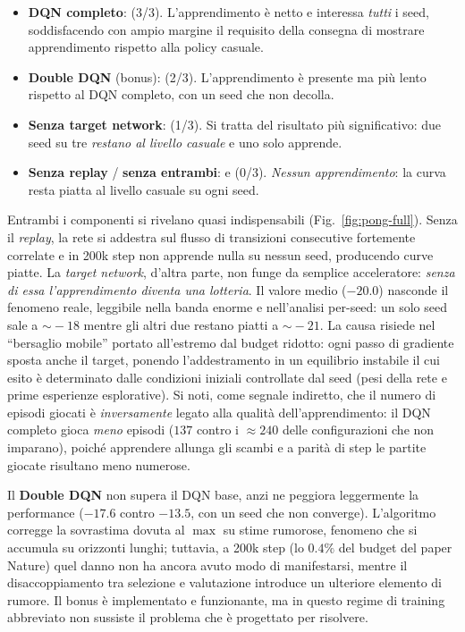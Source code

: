 \begin{itemize}
  \item \textbf{DQN completo}:  (3/3). L'apprendimento \`e netto e
        interessa \emph{tutti} i seed, soddisfacendo con ampio margine il requisito
        della consegna di mostrare apprendimento rispetto alla policy casuale.
  \item \textbf{Double DQN} (bonus):  (2/3). L'apprendimento \`e
        presente ma pi\`u lento rispetto al DQN completo, con un seed che non decolla.
  \item \textbf{Senza target network}:  (1/3). Si tratta del risultato
        pi\`u significativo: due seed su tre \emph{restano al livello casuale} e uno solo
        apprende.
  \item \textbf{Senza replay} / \textbf{senza entrambi}:  e
         (0/3). \emph{Nessun apprendimento}: la curva resta piatta al
        livello casuale su ogni seed.
\end{itemize}



Entrambi i componenti si rivelano quasi indispensabili (Fig.~\ref{fig:pong-full}).
Senza il \emph{replay}, la rete si addestra sul flusso di transizioni consecutive
fortemente correlate e in 200k step non apprende nulla su nessun seed, producendo curve
piatte. La \emph{target network}, d'altra parte, non funge da semplice acceleratore:
\emph{senza di essa l'apprendimento diventa una lotteria}. Il valore medio ($-20.0$)
nasconde il fenomeno reale, leggibile nella banda enorme e nell'analisi per-seed: un
solo seed sale a $\sim\!-18$ mentre gli altri due restano piatti a $\sim\!-21$. La causa
risiede nel ``bersaglio mobile'' portato all'estremo dal budget ridotto: ogni passo di
gradiente sposta anche il target, ponendo l'addestramento in un equilibrio instabile il
cui esito \`e determinato dalle condizioni iniziali controllate dal seed (pesi della rete
e prime esperienze esplorative). Si noti, come segnale indiretto, che il numero di
episodi giocati \`e \emph{inversamente} legato alla qualit\`a dell'apprendimento: il DQN
completo gioca \emph{meno} episodi ($137$ contro i $\approx 240$ delle configurazioni che
non imparano), poich\'e apprendere allunga gli scambi e a parit\`a di step le partite
giocate risultano meno numerose.

Il \textbf{Double DQN} non supera il DQN base, anzi ne peggiora leggermente la
performance ($-17.6$ contro $-13.5$, con un seed che non converge). L'algoritmo
corregge la sovrastima dovuta al $\max$ su stime rumorose, fenomeno che si accumula su
orizzonti lunghi; tuttavia, a 200k step (lo $0.4\%$ del budget del paper Nature) quel
danno non ha ancora avuto modo di manifestarsi, mentre il disaccoppiamento tra selezione
e valutazione introduce un ulteriore elemento di rumore. Il bonus \`e implementato e
funzionante, ma in questo regime di training abbreviato non sussiste il problema che \`e
progettato per risolvere.
